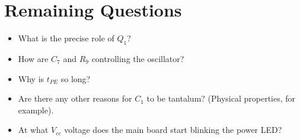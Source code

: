 \documentclass{article}
\newcommand{\Vcc}{$V_{cc}$}
\begin{document}
\section{Remaining Questions}
\label{sec:remaining_questions}
\begin{itemize}
\item What is the precise role of $Q_1$?
\item How are $C_7$ and $R_9$ controlling the oscillator?
\item Why is $t_{PE}$ so long?
\item Are there any other reasons for $C_1$ to be tantalum? (Physical
  properties, for example).
\item At what \Vcc{} voltage does the main board start blinking the
  power LED?
\end{itemize}
\end{document}

